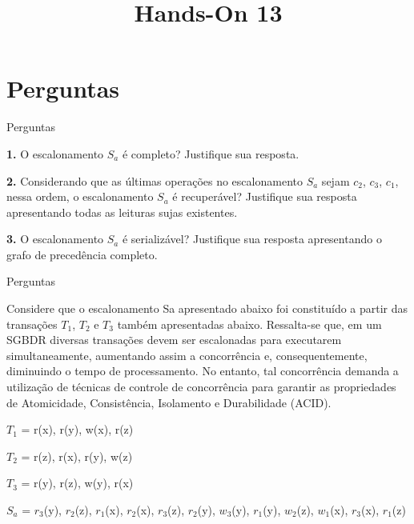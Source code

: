 \documentclass[aspectratio=169]{beamer}
\title{Hands-On 13}
\begin{document}
    \begin{frame}

    \titlepage

    \end{frame}

    \section{Perguntas}

    \begin{frame}{Perguntas}


        \textbf{1.} O escalonamento $S_a$ é completo? Justifique sua resposta.

        \textbf{2.} Considerando que as últimas operações no escalonamento $S_a$ 
        sejam $c_2$, $c_3$, $c_1$, nessa ordem, o escalonamento $S_a$ é recuperável? 
        Justifique sua resposta apresentando todas as leituras sujas 
        existentes.

        \textbf{3.} O escalonamento $S_a$ é serializável? Justifique sua resposta 
        apresentando o grafo de precedência completo.


    \end{frame}
    \begin{frame}{Perguntas}

        Considere que o escalonamento Sa apresentado abaixo foi constituído
        a partir das transações $T_1$, $T_2$ e $T_3$ também apresentadas abaixo. 
        Ressalta-se que, em um SGBDR diversas transações devem ser escalonadas
        para executarem simultaneamente, aumentando assim a concorrência e,
        consequentemente, diminuindo o tempo de processamento. No entanto, 
        tal concorrência demanda a utilização de técnicas de controle de 
        concorrência para garantir as propriedades de Atomicidade, 
        Consistência, Isolamento e Durabilidade (ACID). \newline

            $T_1$ = r(x), r(y), w(x), r(z)

            $T_2$ = r(z), r(x), r(y), w(z)

            $T_3$ = r(y), r(z), w(y), r(x)

            $S_a$ = $r_3$(y), $r_2$(z), $r_1$(x), $r_2$(x), $r_3$(z), $r_2$(y), $w_3$(y),
            $r_1$(y), $w_2$(z), $w_1$(x), $r_3$(x), $r_1$(z)

        

    \end{frame}
\end{document}

